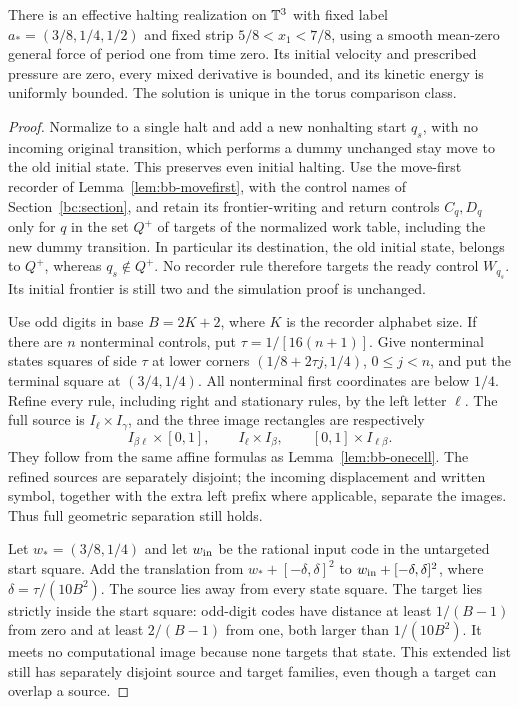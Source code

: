 \begin{theorem}
\label{bc:unit-periodic-event}
There is an effective halting realization on $\mathbb T^3$ with fixed label
$a_*=(3/8,1/4,1/2)$ and fixed strip $5/8<x_1<7/8$, using a smooth
mean-zero general force of period one from time zero. Its initial velocity
and prescribed pressure are zero, every mixed derivative is bounded, and
its kinetic energy is uniformly bounded. The solution is unique in the
torus comparison class.
\end{theorem}
\begin{proof}\label{bc:unit-periodic-event-proof}
Normalize to a single halt and add a new nonhalting start $q_s$, with no
incoming original transition, which performs a dummy unchanged stay move
to the old initial state. This preserves even initial halting. Use the
move-first recorder of Lemma~\ref{lem:bb-movefirst}, with the control names
of Section~\ref{bc:section}, and retain its frontier-writing and return
controls $C_q,D_q$
only for $q$ in the set $Q^+$ of targets of the normalized work table,
including the new dummy transition. In particular its destination, the
old initial state, belongs to $Q^+$, whereas $q_s\notin Q^+$. No recorder
rule therefore targets the ready control $W_{q_s}$. Its
initial frontier is still two and the simulation proof is unchanged.

Use odd digits in base $B=2K+2$, where $K$ is the recorder alphabet size.
If there are $n$ nonterminal controls, put $\tau=1/[16(n+1)]$. Give
nonterminal states squares of side $\tau$ at lower corners
$(1/8+2\tau j,1/4)$, $0\le j<n$, and put the terminal square at
$(3/4,1/4)$. All nonterminal first coordinates are below $1/4$.
Refine every rule, including right and stationary rules, by the left
letter $\ell$. The full source is $I_\ell\times I_\gamma$, and the
three image rectangles are respectively
\begin{equation}\label{bc:unit-rectangles}
 I_{\beta\ell}\times[0,1],\qquad
 I_\ell\times I_\beta,\qquad [0,1]\times I_{\ell\beta}.
\end{equation}
They follow from the same affine formulas as Lemma~\ref{lem:bb-onecell}.
The refined sources are separately disjoint; the incoming displacement
and written symbol, together with the extra left prefix where applicable,
separate the images. Thus full geometric separation still holds.

Let $w_*=(3/8,1/4)$ and let $w_{\rm in}$ be the rational input code in
the untargeted start square. Add the translation from
$w_*+[-\delta,\delta]^2$ to $w_{\rm in}+[-\delta,\delta]^2$, where
$\delta=\tau/(10B^2)$. The source lies away from every state square.
The target lies strictly inside the start square: odd-digit codes have
distance at least $1/(B-1)$ from zero and at least $2/(B-1)$ from one,
both larger than $1/(10B^2)$. It meets no computational image because
none targets that state. This extended list still has separately disjoint
source and target families, even though a target can overlap a source.


\end{proof}
